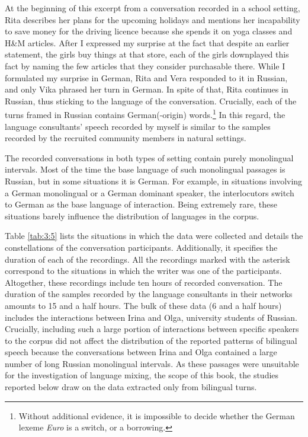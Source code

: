 \noindent At the beginning of this excerpt from a conversation recorded in a school setting, Rita describes her plans for the upcoming holidays and mentions her incapability to save  money for the driving licence because she spends it on yoga classes and H{\&}M articles. After I expressed my surprise at the fact that despite an earlier statement, the girls buy things at that store, each of the girls downplayed this fact by naming the few articles that they consider purchasable there. While I formulated my surprise in German, Rita and Vera responded to it in Russian, and only Vika phrased her turn in German. In spite of that, Rita continues in Russian, thus sticking to the language of the conversation. Crucially, each of the turns framed in Russian contains German(-origin) words.\footnote{Without additional evidence, it is impossible to decide whether the German lexeme \textit{Euro} is a switch, or a borrowing.} In this regard, the language consultants' speech recorded by myself is similar to the samples recorded by the recruited community members in natural settings.

The recorded conversations in both types of setting contain purely monolingual intervals. Most of the time the base language of such monolingual passages is Russian, but in some situations it is German. For example, in situations involving a German monolingual or a German dominant speaker, the interlocutors switch to German as the base language of interaction. Being extremely rare, these situations barely influence the distribution of languages in the corpus.

Table \ref{tab:3:5} lists the situations in which the data were collected and details the constellations of the conversation participants. Additionally, it specifies the duration of each of the recordings. All the recordings marked with the asterisk correspond to the situations in which the writer was one of the participants. Altogether, these recordings include ten hours of recorded conversation. The duration of the samples recorded by the language consultants in their networks amounts to 15 and a half hours. The bulk of these data (6 and a half hours) includes the interactions between Irina and Olga, university students of Russian. Crucially, including such a large portion of interactions between specific speakers to the corpus did not affect the distribution of the reported patterns of bilingual speech because the conversations between Irina and Olga contained a large number of long Russian monolingual intervals. As these passages were unsuitable for the investigation of language mixing, the scope of this book, the studies reported below draw on the data extracted only from bilingual turns.

